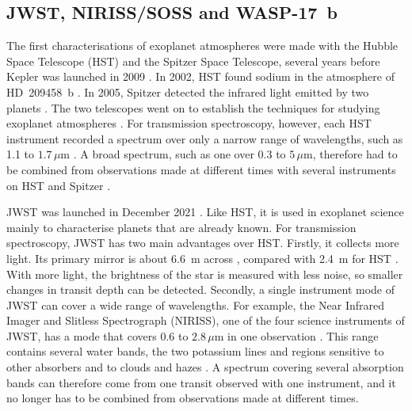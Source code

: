 \subsection{JWST, NIRISS/SOSS and WASP-17~b}
\label{sec:jwst-soss-wasp17}

The first characterisations of exoplanet atmospheres were made with the Hubble
Space Telescope (HST) and the Spitzer Space Telescope, several years before
Kepler was launched in 2009 \citep{BoruckiEtAl2010}. In 2002, HST found
sodium in the atmosphere of HD~209458~b \citep{CharbonneauEtAl2002}. In 2005, Spitzer detected the infrared light emitted by two planets
\citep{DemingEtAl2005,CharbonneauEtAl2005}. The two telescopes went on to
establish the techniques for studying exoplanet atmospheres
\citep{KnutsonEtAl2007,SingEtAl2016}. For transmission spectroscopy, however,
each HST instrument recorded a spectrum over only a narrow range of
wavelengths, such as 1.1 to $1.7\,\mu\mathrm{m}$ \citep{SingEtAl2016}. A broad
spectrum, such as one over 0.3 to $5\,\mu\mathrm{m}$, therefore had to be
combined from observations made at different times with several instruments on HST and Spitzer \citep{SingEtAl2016,AldersonEtAl2022}.

JWST was launched in December 2021 \citep{RigbyEtAl2023}. Like HST, it is used in exoplanet science mainly to characterise planets that are already known. For transmission spectroscopy,
JWST has two main advantages over HST. Firstly, it collects more light. Its
primary mirror is about 6.6~m across \citep{GardnerEtAl2006,RigbyEtAl2023},
compared with 2.4~m for HST \citep{NASAHubbleDesign2026}. With more light, the
brightness of the star is measured with less noise, so smaller changes in
transit depth can be detected. Secondly, a single instrument mode of JWST can
cover a wide range of wavelengths. For example, the Near Infrared Imager and
Slitless Spectrograph (NIRISS), one of the four science instruments of JWST,
has a mode that covers 0.6 to $2.8\,\mu\mathrm{m}$ in one observation
\citep{AlbertEtAl2023}. This range contains several water bands, the two
potassium lines and regions sensitive to other absorbers and to clouds and
hazes \citep{AlbertEtAl2023,HolmbergMadhusudhan2023,LouieEtAl2025}. A spectrum covering several absorption bands can therefore come from one transit observed with one instrument,
and it no longer has to be combined from observations made at different
times.

